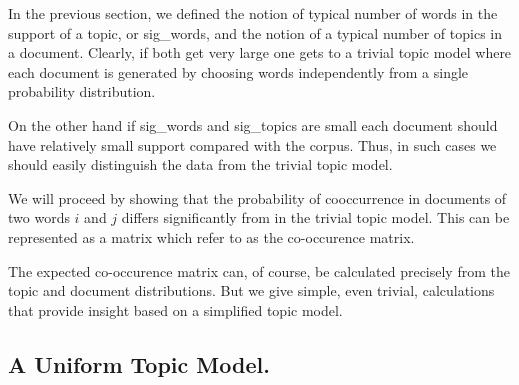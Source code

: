 
In the previous section,  we defined the notion of
typical number of words in the support of a topic, or sig\_words, and
the notion of a typical number of topics in a document.  Clearly, if
both get very large one gets to a trivial topic model where each document
is generated by choosing words independently from a single probability
distribution.  

On the other hand if sig\_words and sig\_topics are small
each document should have relatively small support
compared with the corpus. Thus, in such cases we should
easily distinguish the data from the trivial topic model.




We will proceed by showing that the probability of cooccurrence in
documents of two words $i$ and $j$ differs significantly from in the
trivial topic model. This can be represented as a matrix which
refer to as the co-occurence matrix.

The expected co-occurence matrix can, of course, be calculated
precisely from the topic and document distributions.  But we give
simple, even trivial, calculations that provide insight based on a
simplified topic model.

\subsection{A Uniform Topic Model.}

